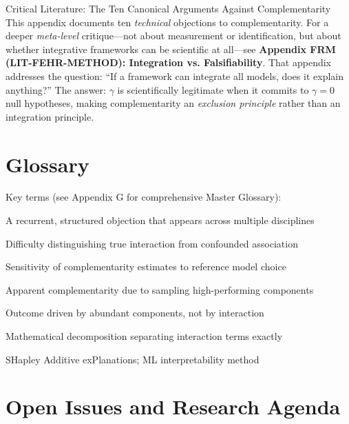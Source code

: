 \begin{chapter}{Critical Literature: The Ten Canonical Arguments Against Complementarity}
This appendix documents ten \textit{technical} objections to complementarity. For a
deeper \textit{meta-level} critique---not about measurement or identification, but
about whether integrative frameworks can be scientific at all---see \textbf{Appendix FRM
(LIT-FEHR-METHOD): Integration vs. Falsifiability}. That appendix addresses the
question: ``If a framework can integrate all models, does it explain anything?''
The answer: $\gamma$ is scientifically legitimate when it commits to $\gamma = 0$
null hypotheses, making complementarity an \textit{exclusion principle} rather than
an integration principle.

\section{Glossary}
\label{sec:glossary}

Key terms (see Appendix G for comprehensive Master Glossary):

\begin{description}[style=nextline]
    \item[Canonical Argument] A recurrent, structured objection that appears across multiple disciplines
    \item[Identification Problem] Difficulty distinguishing true interaction from confounded association
    \item[Model-Dependence] Sensitivity of complementarity estimates to reference model choice
    \item[Selection Effect] Apparent complementarity due to sampling high-performing components
    \item[Mass-Ratio Effect] Outcome driven by abundant components, not by interaction
    \item[Möbius Inversion] Mathematical decomposition separating interaction terms exactly
    \item[SHAP] SHapley Additive exPlanations; ML interpretability method
\end{description}

\section{Open Issues and Research Agenda}
\label{sec:crt-open-issues}


\end{chapter}
